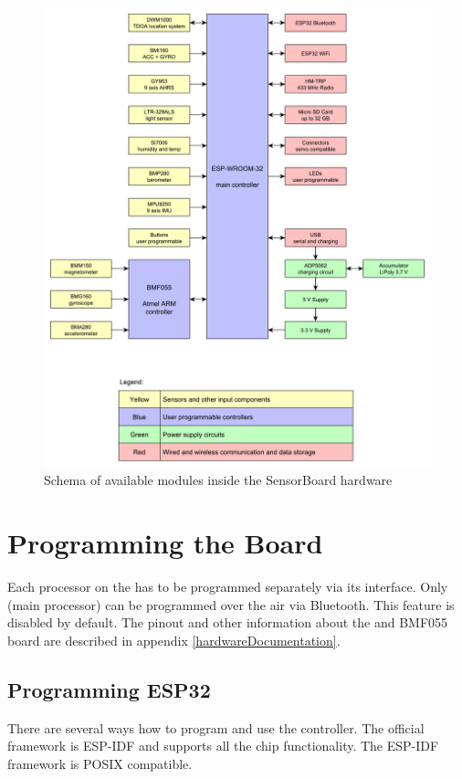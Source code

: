 \begin{figure}
    \centering
    \caption{Schema of available modules inside the SensorBoard hardware}
    \label{fig:SWmodules}
    \includegraphics[width=\linewidth]{img/SensorBoardSchema.pdf}
\end{figure}

\section{Programming the Board}
Each processor on the  has to be programmed separately via its interface. Only  \cite{espressif:ESP-WROOM-32} (main processor) can be programmed over the air via Bluetooth. This feature is disabled by default. The pinout and other information about the  and BMF055 board are described in appendix \ref{hardwareDocumentation}.

\subsection{Programming ESP32}
There are several ways how to program and use the  \cite{espressif:ESP-WROOM-32} controller. The official framework is \ac{ESP-IDF} \cite{espressif:ESP-IDF} and supports all the chip functionality. The \ac{ESP-IDF} framework is \ac{POSIX} compatible.

